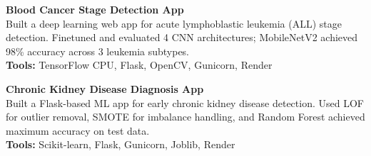 \begin{cvlistsection}
\item \textbf{Blood Cancer Stage Detection App} \href{https://github.com/2ufiq/Vision-Blood-Cancer-Stage-Detection}{\faGithub}\\
Built a deep learning web app for acute lymphoblastic leukemia (ALL) stage detection. Finetuned and evaluated 4 CNN architectures; MobileNetV2 achieved 98\% accuracy across 3 leukemia subtypes.\\
\textbf{Tools:} TensorFlow CPU, Flask, OpenCV, Gunicorn, Render

\item \textbf{Chronic Kidney Disease Diagnosis App} \href{https://github.com/2ufiq/ML-Kidney-Disease-Diagnosis}{\faGithub}\\
Built a Flask-based ML app for early chronic kidney disease detection. Used LOF for outlier removal, SMOTE for imbalance handling, and Random Forest achieved maximum accuracy on test data.\\
\textbf{Tools:} Scikit-learn, Flask, Gunicorn, Joblib, Render

\end{cvlistsection}
